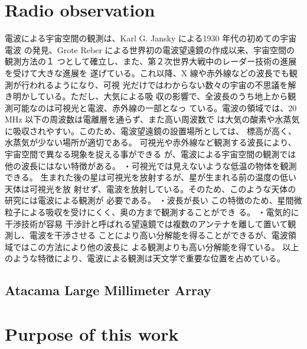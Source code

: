 \section{Radio observation}
電波による宇宙空間の観測は、Karl G. Jansky による1930 年代の初めての宇宙電波
の発見、Grote Reber による世界初の電波望遠鏡の作成以来、宇宙空間の観測方法の１
つとして確立し、また、第２次世界大戦中のレーダー技術の進展を受けて大きな進展を
遂げている。これ以降、X 線や赤外線などの波長でも観測が行われるようになり、可視
光だけではわからない数々の宇宙の不思議を解き明かしている。ただし、大気による吸
収の影響で、全波長のうち地上から観測可能なのは可視光と電波、赤外線の一部となっ
ている。電波の領域では、20 MHz 以下の周波数は電離層を通らず、また高い周波数で
は大気の酸素や水蒸気に吸収されやすい。このため、電波望遠鏡の設置場所としては、
標高が高く、水蒸気が少ない場所が適切である。
可視光や赤外線など観測する波長により、宇宙空間で異なる現象を捉える事ができる
が、電波による宇宙空間の観測では他の波長にはない特徴がある。
・可視光では見えないような低温の物体を観測できる。
生まれた後の星は可視光を放射するが、星が生まれる前の温度の低い天体は可視光を放
射せず、電波を放射している。そのため、このような天体の研究には電波による観測が
必要である。
・波長が長い
この特徴のため、星間微粒子による吸収を受けにくく、奥の方まで観測することができ
る。
・電気的に干渉技術が容易
干渉計と呼ばれる望遠鏡では複数のアンテナを離して置いて観測し、電波を干渉させる
ことにより高い分解能を得ることができるが、電波領域ではこの方法により他の波長に
よる観測よりも高い分解能を得ている。
以上のような特徴により、電波による観測は天文学で重要な位置を占めている。

\subsection{Atacama Large Millimeter Array}

\section{Purpose of this work}